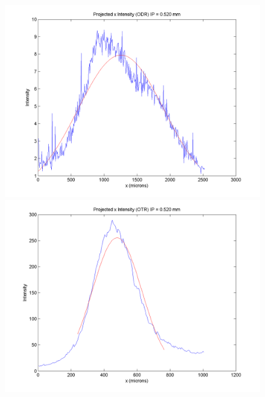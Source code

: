 \documentclass[12pt]{article}
\begin{document}
\begin{figure}
\begin{center}
\includegraphics[scale=0.5]{Figures/ProjX_ODR_520.PNG}
\includegraphics[scale=0.5]{Figures/ProjX_OTR_520.PNG}
\caption{}
\end{center}
\end{figure}
\end{document}
